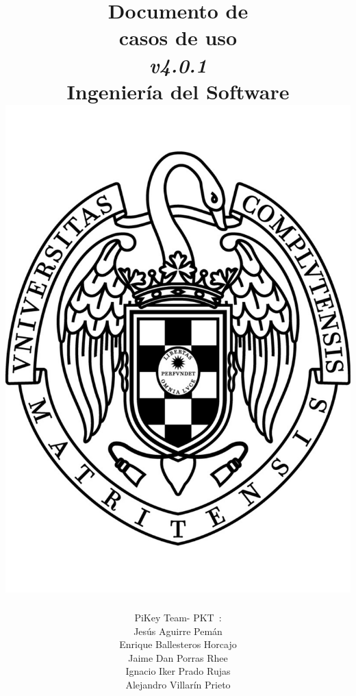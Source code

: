\documentclass[spanish,a4paper,11pt, twoside]{report}	%
\newcommand*{\PKT}{\hbox{P}\kern-2.5pt\lower3.5pt\hbox{\small{K}}\kern-2.8pt\hbox{T}\kern-2pt}	%
\begin{document}
\title{\textbf{\huge{Documento de \\ 
	casos de uso}} \\ 
	\textit{v4.0.1} \\	\vspace{0.1cm}
	\Large{Ingeniería del Software} \\
	\includegraphics[scale=0.3]{ucm.pdf}}
\author{{\Large{PiKey Team-}} \PKT \ : \vspace{0.2cm} \\
	Jesús Aguirre Pemán \\
	 Enrique Ballesteros Horcajo \\
	 Jaime Dan Porras Rhee \\
	 Ignacio Iker Prado Rujas \\
	 Alejandro Villarín Prieto }
\date{\Today}
\maketitle
\end{document}
